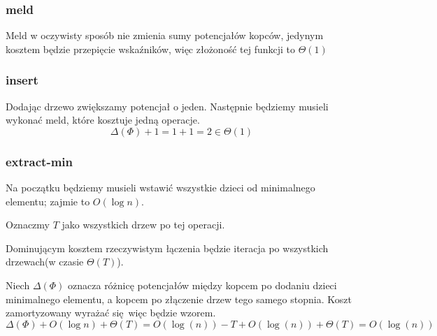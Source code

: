\subsubsection{meld}
Meld w oczywisty sposób nie zmienia sumy potencjałów kopców, jedynym kosztem będzie przepięcie wskaźników, więc złożoność tej funkcji to $\Theta(1)$
\subsubsection{insert}
Dodając drzewo zwiększamy potencjał o jeden.
Następnie będziemy musieli wykonać meld, które kosztuje jedną operacje.
\[
  \Delta(\Phi) + 1 = 1 + 1 = 2 \in \Theta(1)
\]
\subsubsection{extract-min}
Na początku będziemy musieli wstawić wszystkie dzieci od minimalnego elementu; zajmie to $O(\log n)$.

Oznaczmy $T$ jako wszystkich drzew po tej operacji.

Dominującym kosztem rzeczywistym łączenia będzie iteracja po wszystkich drzewach(w czasie $\Theta(T)$).

Niech $\Delta(\Phi)$ oznacza różnicę potencjałów między kopcem po dodaniu dzieci minimalnego elementu, a kopcem po złączenie drzew tego samego stopnia.
Koszt zamortyzowany wyrażać się więc będzie wzorem.
\[
  \Delta(\Phi) + O(\log n) + \Theta(T) = O(\log(n)) - T + O(\log(n)) + \Theta(T) = O(\log(n))
\]

